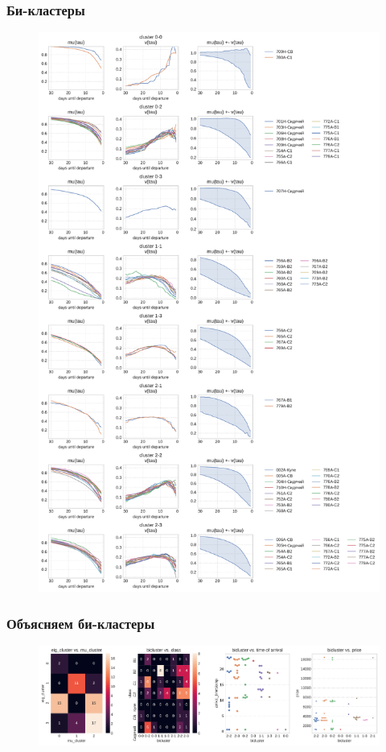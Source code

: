 \documentclass[11pt,aspectratio=169]{beamer}
\begin{document}
\begin{frame}
    \frametitle{Би-кластеры}

    \begin{figure}
        \centering
        \includegraphics[height=0.92\textheight]{../data/figures/biclusters.pdf}
    \end{figure}

\end{frame}

\begin{frame}
    \frametitle{Объясняем би-кластеры}

    \begin{figure}
        \centering
        \includegraphics[width=\textwidth]{../data/figures/explaining_biclusters.pdf}
    \end{figure}

\end{frame}
\end{document}
